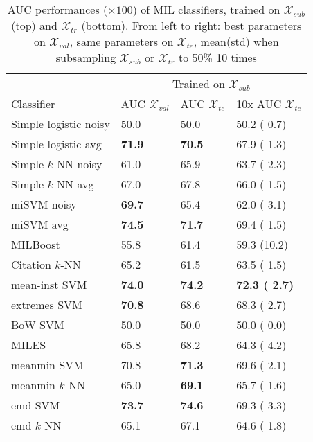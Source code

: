 \documentclass[10pt,conference,a4paper]{IEEEtran}
\begin{document}
\begin{table}[ht]

\caption{AUC performances ($\times 100$) of MIL classifiers, trained on $\mathcal{X}_{sub}$ (top) and $\mathcal{X}_{tr}$ (bottom). From left to right: best parameters on $\mathcal{X}_{val}$,  same parameters on $\mathcal{X}_{te}$, mean(std) when subsampling $\mathcal{X}_{sub}$ or $\mathcal{X}_{tr}$ to 50\% 10 times}

\begin{center}
\begin{tabular}{l l l l}






 & \multicolumn{3}{c}{Trained on $\mathcal{X}_{sub}$} \\
  Classifier &    AUC $\mathcal{X}_{val}$ & AUC $\mathcal{X}_{te}$ & 10x AUC $\mathcal{X}_{te}$ \\


\hline


Simple logistic noisy & 50.0 & 50.0 & 50.2 ( 0.7)\\
Simple logistic avg   & {\bf 71.9 }& {\bf 70.5 }& 67.9 ( 1.3)\\
Simple $k$-NN noisy     & 61.0 & 65.9 & 63.7 ( 2.3)\\
Simple $k$-NN avg       & 67.0 & 67.8 & 66.0 ( 1.5)\\
miSVM noisy           & {\bf 69.7 }& 65.4 & 62.0 ( 3.1)\\
miSVM avg             & {\bf 74.5 }& {\bf 71.7 }& 69.4 ( 1.5)\\
MILBoost 		           & 55.8 & 61.4 & 59.3 (10.2)\\
Citation $k$-NN         & 65.2 & 61.5 & 63.5 ( 1.5)\\
mean-inst SVM         & {\bf 74.0 }& {\bf 74.2 }& {\bf 72.3 ( 2.7)}\\
extremes SVM          & {\bf 70.8 }& 68.6 & 68.3 ( 2.7)\\
BoW SVM               & 50.0 & 50.0 & 50.0 ( 0.0)\\
MILES                 & 65.8 & 68.2 & 64.3 ( 4.2)\\
meanmin SVM           & 70.8 & {\bf 71.3 }& 69.6 ( 2.1)\\
meanmin $k$-NN          & 65.0 & {\bf 69.1 }& 65.7 ( 1.6)\\
emd SVM               & {\bf 73.7 }& {\bf 74.6 }& 69.3 ( 3.3)\\
emd $k$-NN              & 65.1 & 67.1 & 64.6 ( 1.8)\\




\end{tabular}
\end{center}
\end{table}
\end{document}

